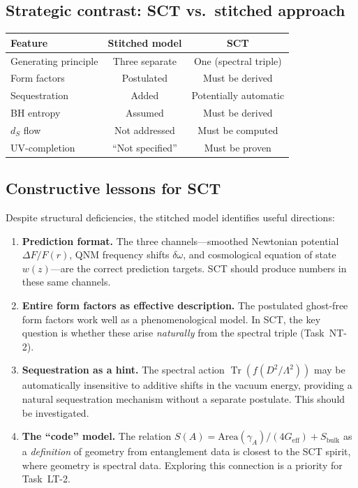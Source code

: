 \documentclass[12pt,a4paper]{article}
\newcommand{\Tr}{\operatorname{Tr}}
\newcommand{\Lam}{\Lambda}
\begin{document}
\subsection{Strategic contrast: SCT vs.\ stitched approach}

\begin{center}
\begin{tabular}{lcc}
\toprule
\textbf{Feature} & \textbf{Stitched model} & \textbf{SCT} \\
\midrule
Generating principle & Three separate & One (spectral triple) \\
Form factors & Postulated & Must be derived \\
Sequestration & Added & Potentially automatic \\
BH entropy & Assumed & Must be derived \\
$d_S$ flow & Not addressed & Must be computed \\
UV-completion & ``Not specified'' & Must be proven \\
\bottomrule
\end{tabular}
\end{center}

\subsection{Constructive lessons for SCT}

Despite structural deficiencies, the stitched model identifies useful
directions:

\begin{enumerate}
  \item \textbf{Prediction format.} The three channels---smoothed Newtonian potential
    $\Delta F/F(r)$, QNM frequency shifts $\delta\omega$, and cosmological equation
    of state $w(z)$---are the correct prediction targets. SCT should produce numbers
    in these same channels.

  \item \textbf{Entire form factors as effective description.} The postulated
    ghost-free form factors work well as a phenomenological model. In SCT, the key
    question is whether these arise \emph{naturally} from the spectral triple
    (Task~NT-2).

  \item \textbf{Sequestration as a hint.} The spectral action
    $\Tr(f(D^2/\Lam^2))$ may be automatically insensitive to additive shifts
    in the vacuum energy, providing a natural sequestration mechanism without
    a separate postulate. This should be investigated.

  \item \textbf{The ``code'' model.} The relation
    $S(A) = \text{Area}(\gamma_A)/(4G_{\text{eff}}) + S_{\text{bulk}}$
    as a \emph{definition} of geometry from entanglement data is closest to the
    SCT spirit, where geometry is spectral data. Exploring this connection is
    a priority for Task~LT-2.
\end{enumerate}
\end{document}
